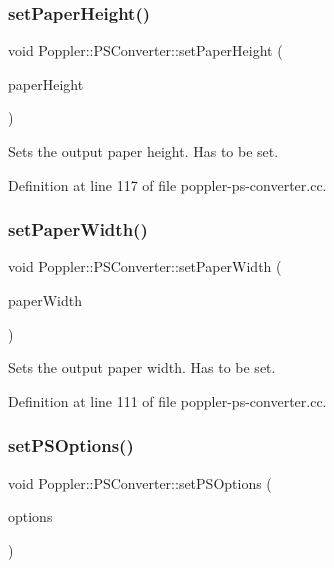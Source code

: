 \subsubsection{\texorpdfstring{set\+Paper\+Height()}{setPaperHeight()}}
{\footnotesize\ttfamily void Poppler\+::\+P\+S\+Converter\+::set\+Paper\+Height (\begin{DoxyParamCaption}\item[{int}]{paper\+Height }\end{DoxyParamCaption})}

Sets the output paper height. Has to be set. 

Definition at line 117 of file poppler-\/ps-\/converter.\+cc.

\mbox{\label{class_poppler_1_1_p_s_converter_ae110aaa5e605065d65097769dd970045}} 
\subsubsection{\texorpdfstring{set\+Paper\+Width()}{setPaperWidth()}}
{\footnotesize\ttfamily void Poppler\+::\+P\+S\+Converter\+::set\+Paper\+Width (\begin{DoxyParamCaption}\item[{int}]{paper\+Width }\end{DoxyParamCaption})}

Sets the output paper width. Has to be set. 

Definition at line 111 of file poppler-\/ps-\/converter.\+cc.

\mbox{\label{class_poppler_1_1_p_s_converter_a11268ce2b1f53480accb3782ab070e2a}} 
\subsubsection{\texorpdfstring{set\+P\+S\+Options()}{setPSOptions()}}
{\footnotesize\ttfamily void Poppler\+::\+P\+S\+Converter\+::set\+P\+S\+Options (\begin{DoxyParamCaption}\item[{P\+S\+Options}]{options }\end{DoxyParamCaption})}

